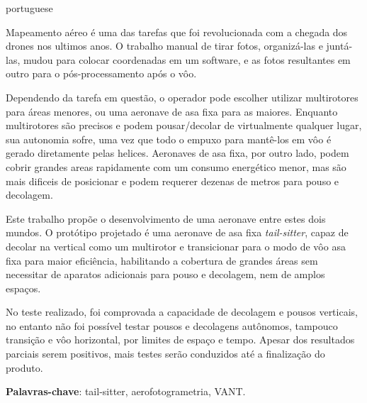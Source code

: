 
\setlength{\absparsep}{18pt} %
\begin{resumo}[Resumo]
 \begin{otherlanguage*}{portuguese}

Mapeamento aéreo é uma das tarefas que foi revolucionada com a chegada dos drones nos ultimos anos.
%
O trabalho manual de tirar fotos, organizá-las e juntá-las, mudou para colocar coordenadas em um software, e as fotos resultantes em outro para o pós-processamento após o vôo.
%

Dependendo da tarefa em questão, o operador pode escolher utilizar multirotores para áreas menores, ou uma aeronave de asa fixa para as maiores.
%
Enquanto multirotores são precisos e podem pousar/decolar de virtualmente qualquer lugar, sua autonomia sofre, uma vez que todo o empuxo para mantê-los em vôo é gerado diretamente pelas helices.
%
Aeronaves de asa fixa, por outro lado, podem cobrir grandes areas rapidamente com um consumo energético menor, mas são mais dificeis de posicionar e podem requerer dezenas de metros para pouso e decolagem.

%
Este trabalho propõe o desenvolvimento de uma aeronave entre estes dois mundos.
%
O protótipo projetado é uma aeronave de asa fixa \textit{tail-sitter}, capaz de decolar na vertical como um multirotor e transicionar para o modo de vôo asa fixa para maior eficiência, habilitando a cobertura de grandes áreas sem necessitar de aparatos adicionais para pouso e decolagem, nem de amplos espaços.
%

No teste realizado, foi comprovada a capacidade de decolagem e pousos verticais, no entanto não foi possível testar pousos e decolagens autônomos, tampouco transição e vôo horizontal, por limites de espaço e tempo. Apesar dos resultados parciais serem positivos, mais testes serão conduzidos até a finalização do produto.
%


 \textbf{Palavras-chave}: tail-sitter, aerofotogrametria, VANT.
  \end{otherlanguage*}
\end{resumo}

